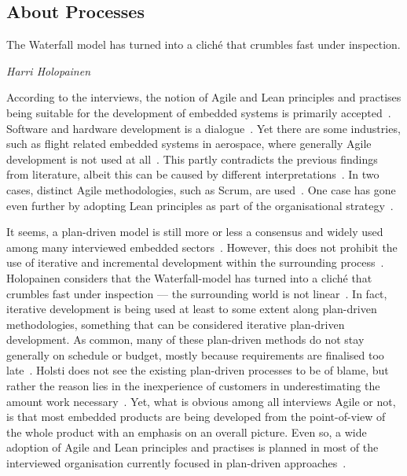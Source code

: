 \documentclass[english]{tktltiki2}
\begin{document}
\subsection{About Processes}

\epigraph{The Waterfall model has turned into a cliché that crumbles fast under inspection.}{\textit{Harri Holopainen~\cite{Hol15a}}}

According to the interviews, the notion of Agile and Lean principles and practises being suitable for the development of embedded systems is primarily accepted~\cite{Hol15a, Koi15, Kri15, Pet15}. Software and hardware development is a dialogue~\cite{BT15}. Yet there are some industries, such as flight related embedded systems in aerospace, where generally Agile development is not used at all~\cite{Hol15b}. This partly contradicts the previous findings from literature, albeit this can be caused by different interpretations~\cite{LB03}. In two cases, distinct Agile methodologies, such as Scrum, are used~\cite{BT15, Pet15}. One case has gone even further by adopting Lean principles as part of the organisational strategy~\cite{BT15}.

It seems, a plan-driven model is still more or less a consensus and widely used among many interviewed embedded sectors~\cite{Hol15b, Koi15}. However, this does not prohibit the use of iterative and incremental development within the surrounding process~\cite{Hol15b}. Holopainen considers that the Waterfall-model has turned into a cliché that crumbles fast under inspection — the surrounding world is not linear~\cite{Hol15a}. In fact, iterative development is being used at least to some extent along plan-driven methodologies, something that can be considered iterative plan-driven development. As common, many of these plan-driven methods do not stay generally on schedule or budget, mostly because requirements are finalised too late~\cite{Hol15b}. Holsti does not see the existing plan-driven processes to be of blame, but rather the reason lies in the inexperience of customers in underestimating the amount work necessary~\cite{Hol15b}. Yet, what is obvious among all interviews Agile or not, is that most embedded products are being developed from the point-of-view of the whole product with an emphasis on an overall picture. Even so, a wide adoption of Agile and Lean principles and practises is planned in most of the interviewed organisation currently focused in plan-driven approaches~\cite{Koi15}.
\end{document}
